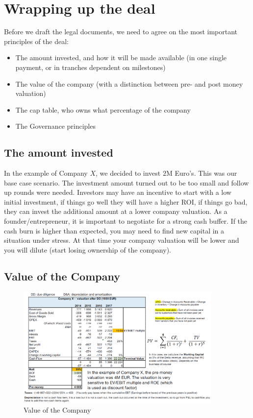 \section{Wrapping up the deal}

Before we draft the legal documents, we need to agree on the most important
principles of the deal:
\begin{itemize}
    \item The amount invested, and how it will be made available (in one single
        payment, or in tranches dependent on milestones)
    \item The value of the company (with a distinction between pre- and post money
        valuation)
    \item The cap table, who owns what percentage of the company
    \item The Governance principles
\end{itemize}

\subsection{The amount invested}

In the example of Company $X$, we decided to invest $2$M Euro's. This was
our base case scenario. The investment amount turned out to be too small
and follow up rounds were needed. Investors may have an incentive to start
with a low initial investment, if things go well they will have a higher
ROI, if things go bad, they can invest the additional amount at a lower
company valuation. As a founder/entrepreneur, it is important to negotiate
for a strong cash buffer. If the cash burn is higher than expected, you may
need to find new capital in a situation under stress. At that time your
company valuation will be lower and you will dilute (start losing ownership
of the company).

\subsection{Value of the Company}

\begin{figure}[H]
    \centering
    \includegraphics[width=0.9\textwidth]{Pictures/value_of_the_company.png}
    \caption{Value of the Company}
\end{figure}

